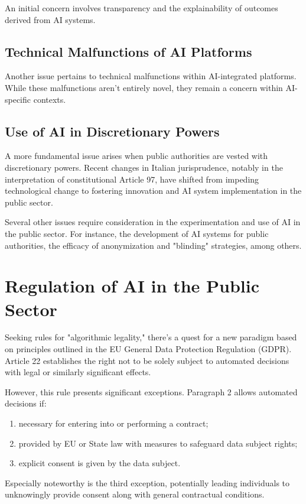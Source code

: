 An initial concern involves transparency and the explainability of outcomes derived from AI systems.

\subsection{Technical Malfunctions of AI Platforms}

Another issue pertains to technical malfunctions within AI-integrated platforms. While these malfunctions aren't entirely novel, they remain a concern within AI-specific contexts.

\subsection{Use of AI in Discretionary Powers}

A more fundamental issue arises when public authorities are vested with discretionary powers. Recent changes in Italian jurisprudence, notably in the interpretation of constitutional Article 97, have shifted from impeding technological change to fostering innovation and AI system implementation in the public sector.

Several other issues require consideration in the experimentation and use of AI in the public sector. For instance, the development of AI systems for public authorities, the efficacy of anonymization and "blinding" strategies, among others.

\section{Regulation of AI in the Public Sector}

Seeking rules for "algorithmic legality," there's a quest for a new paradigm based on principles outlined in the EU General Data Protection Regulation (GDPR). Article 22 establishes the right not to be solely subject to automated decisions with legal or similarly significant effects.

However, this rule presents significant exceptions. Paragraph 2 allows automated decisions if:

\begin{enumerate}
    \item necessary for entering into or performing a contract;
    \item provided by EU or State law with measures to safeguard data subject rights;
    \item explicit consent is given by the data subject.
\end{enumerate}

Especially noteworthy is the third exception, potentially leading individuals to unknowingly provide consent along with general contractual conditions.
